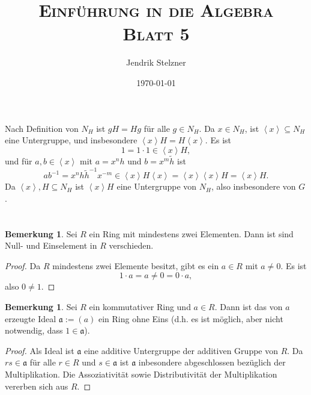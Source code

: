 \documentclass[a4paper,10pt]{article}
\title{\textsc{Einführung in die Algebra \\ \Large Blatt 5}}
\author{Jendrik Stelzner}
\date{\today}
\theoremstyle{definition}
\newtheorem{bem}[beh]{Bemerkung}
\newcommand{\mf}[1]{\mathfrak{#1}}
\newcommand{\gen}[1]{\left\langle#1\right\rangle}
\begin{document}
\maketitle





\section{}


\subsection{}
Nach Definition von $N_H$ ist $gH = Hg$ für alle $g \in N_H$. Da $x \in N_H$, ist $\gen{x} \subseteq N_H$ eine Untergruppe, und insbesondere $\gen{x}H = H\gen{x}$.
Es ist
\[
 1 = 1 \cdot 1 \in \gen{x}H,
\]
und für $a,b \in \gen{x}$ mit $a = x^n h$ und $b = x^m \tilde{h}$ ist
\[
 ab^{-1} = x^n h \tilde{h}^{-1} x^{-m} \in \gen{x} H \gen{x} = \gen{x} \gen{x} H = \gen{x} H.
\]
Da $\gen{x}, H \subseteq N_H$ ist $\gen{x}H$ eine Untergruppe von $N_H$, also insbesondere von $G$.






\section{}





\section{}

\begin{bem}\label{bem: 0 neq 1}
 Sei $R$ ein Ring mit mindestens zwei Elementen. Dann ist sind Null- und Einselement in $R$ verschieden.
\end{bem}
\begin{proof}
 Da $R$ mindestens zwei Elemente besitzt, gibt es ein $a \in R$ mit $a \neq 0$. Es ist
 \[
  1 \cdot a = a \neq 0 = 0 \cdot a,
 \]
 also $0 \neq 1$.
\end{proof}

\begin{bem}\label{bem: ideal ring ohne null}
 Sei $R$ ein kommutativer Ring und $a \in R$. Dann ist das von $a$ erzeugte Ideal $\mf{a} := (a)$ ein Ring ohne Eins (d.h. es ist möglich, aber nicht notwendig, dass $1 \in \mf{a}$).
\end{bem}
\begin{proof}
 Als Ideal ist $\mf{a}$ eine additive Untergruppe der additiven Gruppe von $R$. Da $rs \in \mf{a}$ für alle $r \in R$ und $s \in \mf{a}$ ist $\mf{a}$ inbesondere abgeschlossen bezüglich der Multiplikation. Die Assoziativität sowie Distributivität der Multiplikation vererben sich aus $R$.
\end{proof}
\end{document}
